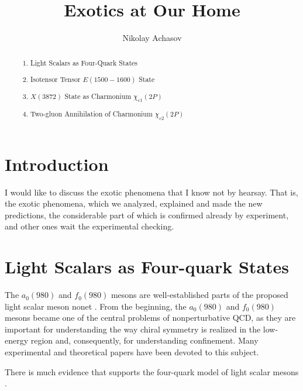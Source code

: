 \documentclass[aps,preprint,groupedaddress,floatfix]{revtex4}
\begin{document}
\title{ Exotics at Our Home}
\author {
Nikolay Achasov }



\begin{abstract}
\begin{enumerate}
\item Light Scalars as  Four-Quark States
\item Isotensor Tensor $E(1500-1600)$ State
\item $X(3872)$ State as  Charmonium $\chi_{c1}(2P)$
\item Two-gluon Annihilation of Charmonium $\chi_{c2}(2P)$
\end{enumerate}
\end{abstract}

%
\maketitle
%
\section{Introduction}
\label{intro} I would like to discuss the exotic phenomena  that I
know not by hearsay. That is, the exotic phenomena, which we
analyzed, explained and made the new predictions, the considerable
part of which is confirmed already by experiment, and other ones
wait the experimental checking.
\section{Light Scalars as  Four-quark States }
\label{sec-1} The $a_0(980)$ and $f_0(980)$ mesons are
well-established parts of the proposed light scalar meson nonet
\cite{pdg-2018}. From the beginning, the $a_0(980)$ and $f_0(980)$
mesons became one of the central problems of nonperturbative QCD,
as they are important for understanding the way chiral symmetry is
realized in the low-energy region and, consequently, for
understanding confinement. Many experimental and theoretical
papers have been devoted to this subject.

There is much evidence that supports the four-quark model of light
scalar mesons \cite{jaffe,weinberg}.
\end{document}
